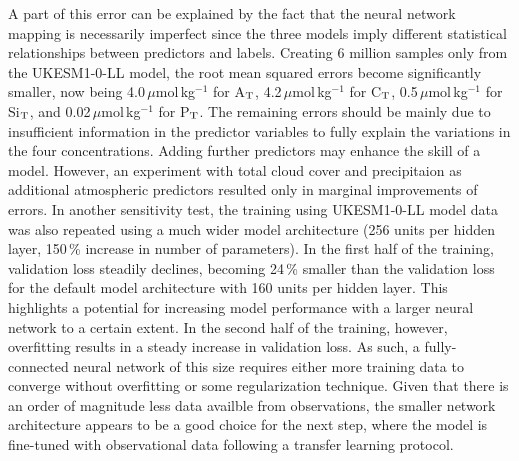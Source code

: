 \documentclass{article}
\begin{document}
	A part of this error can be explained by the fact that the neural network mapping is necessarily imperfect since the three models imply different statistical relationships between predictors and labels. Creating 6 million samples only from the UKESM1-0-LL model, the root mean squared errors become significantly smaller, now being 4.0\,$\mu$mol\,kg$^{-1}$ for A$_\textup{T}$, 4.2\,$\mu$mol\,kg$^{-1}$ for C$_\textup{T}$, 0.5\,$\mu$mol\,kg$^{-1}$ for Si$_\textup{T}$, and 0.02\,$\mu$mol\,kg$^{-1}$ for P$_\textup{T}$. The remaining errors should be mainly due to insufficient information in the predictor variables to fully explain the variations in the four concentrations. Adding further predictors may enhance the skill of a model. However, an experiment with total cloud cover and precipitaion as additional atmospheric predictors resulted only in marginal improvements of errors. In another sensitivity test, the training using UKESM1-0-LL model data was also repeated using a much wider model architecture (256 units per hidden layer, 150\,\% increase in number of parameters). In the first half of the training, validation loss steadily declines, becoming 24\,\% smaller than the validation loss for the default model architecture with 160 units per hidden layer. This highlights a potential for increasing model performance with a larger neural network to a certain extent. In the second half of the training, however, overfitting results in a steady increase in validation loss. As such, a fully-connected neural network of this size requires either more training data to converge without overfitting or some regularization technique. Given that there is an order of magnitude less data availble from observations, the smaller network architecture appears to be a good choice for the next step, where the model is fine-tuned with observational data following a transfer learning protocol. 
	
\end{document}
